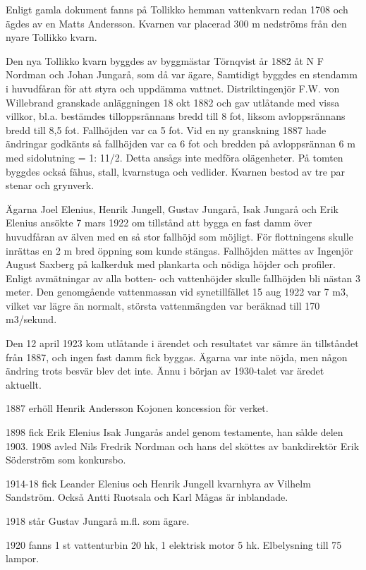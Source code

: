 
Enligt gamla dokument fanns på Tollikko hemman vattenkvarn redan 1708 och ägdes av en Matts Andersson. Kvarnen var placerad 300 m nedströms från den nyare Tollikko kvarn.

Den nya Tollikko kvarn byggdes av byggmästar Törnqvist år 1882 åt N F Nordman och Johan Jungarå, som då var ägare, Samtidigt byggdes en stendamm i huvudfåran för att styra och uppdämma vattnet. Distriktingenjör F.W. 	von 	Willebrand granskade anläggningen 18 okt 1882 och gav utlåtande med vissa villkor, bl.a. bestämdes tilloppsrännans bredd till 8 fot, liksom avloppsrännans bredd till 8,5 fot. Fallhöjden var ca 5 fot. Vid en ny granskning 1887 hade ändringar	godkänts så fallhöjden var ca 6 fot och bredden på avloppsrännan 6 m med sidolutning = 1: 11/2. Detta ansågs inte medföra olägenheter. På tomten byggdes också fähus, stall, kvarnstuga och vedlider. Kvarnen bestod av tre par stenar och grynverk.

Ägarna Joel Elenius, Henrik Jungell, Gustav Jungarå, Isak Jungarå och Erik Elenius ansökte 7 mars 1922 om tillstånd att bygga en fast damm över huvudfåran av älven med en så stor fallhöjd som möjligt. För flottningens skulle inrättas en 2 m bred öppning som kunde stängas. Fallhöjden mättes av Ingenjör August Saxberg på kalkerduk med plankarta och nödiga höjder och profiler. Enligt avmätningar av alla botten- och vattenhöjder skulle fallhöjden bli nästan 3 meter. Den genomgående vattenmassan vid synetillfället 15 aug 1922 var 7 m3, vilket var lägre än normalt, största vattenmängden var beräknad till 170 m3/sekund.

Den 12 april 1923 kom utlåtande i ärendet och resultatet var sämre än tillståndet från 1887, och ingen fast damm fick byggas. Ägarna var inte nöjda, men någon ändring trots besvär blev det inte. Ännu i början av 1930-talet var äredet aktuellt.

1887 erhöll Henrik Andersson Kojonen koncession för verket.

1898 fick Erik Elenius Isak Jungarås andel genom testamente, han sålde delen 1903. 1908 avled Nils Fredrik Nordman och hans del sköttes av bankdirektör Erik Söderström som konkursbo.

1914-18 fick Leander Elenius och Henrik Jungell kvarnhyra av Vilhelm Sandström. Också Antti Ruotsala och Karl Mågas är inblandade.

1918 står Gustav Jungarå m.fl. som ägare.

1920 fanns 1 st vattenturbin 20 hk, 1 elektrisk motor 5 hk. Elbelysning till 75 lampor.

